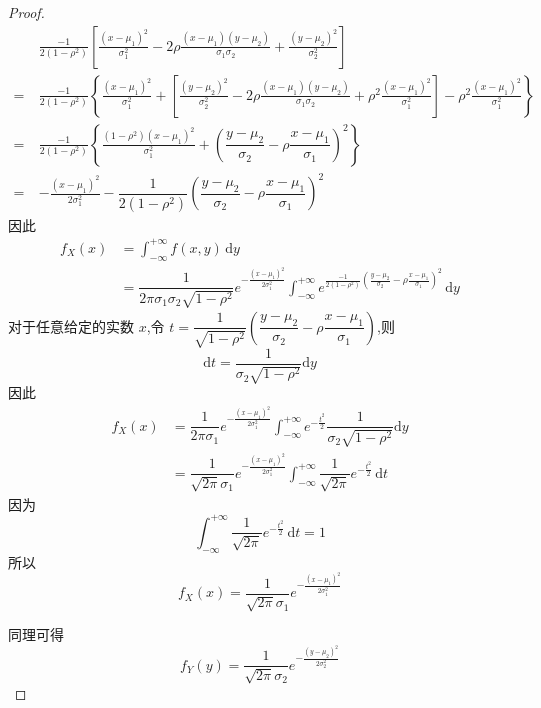 \begin{proof}
    $$
    \begin{aligned}
        & \frac{-1}{2(1-\rho^2)} \left[ \frac{(x-\mu_1)^2}{\sigma_1^2} - 2 \rho \frac{(x-\mu_1)(y-\mu_2)}{\sigma_1 \sigma_2} + \frac{(y-\mu_2)^2}{\sigma_2^2} \right] \\
        = \  & \frac{-1}{2(1-\rho^2)} \left\{ \frac{(x-\mu_1)^2}{\sigma_1^2} + \left[ \frac{(y-\mu_2)^2}{\sigma_2^2} - 2 \rho \frac{(x-\mu_1)(y-\mu_2)}{\sigma_1 \sigma_2} + \rho^2 \frac{(x-\mu_1)^2}{\sigma_1^2} \right] - \rho^2 \frac{(x-\mu_1)^2}{\sigma_1^2} \right\} \\
        = \  & \frac{-1}{2(1-\rho^2)} \left\{ \frac{(1-\rho^2)(x-\mu_1)^2}{\sigma_1^2} + \left( \dfrac{y-\mu_2}{\sigma_2} - \rho \dfrac{x-\mu_1}{\sigma_1} \right)^2 \right\} \\
        = \  & -\frac{(x-\mu_1)^2}{2\sigma_1^2} - \dfrac{1}{2(1-\rho^2)} \left( \dfrac{y-\mu_2}{\sigma_2} - \rho \dfrac{x-\mu_1}{\sigma_1} \right)^2
    \end{aligned}
    $$
    因此
    $$
    \begin{aligned}
        f_{X}(x) &= \int_{-\infty}^{+\infty} f(x,y) \, \text{d}y \\
        &= \dfrac{1}{2 \pi \sigma_1 \sigma_2 \sqrt{1-\rho^2}} e^{-\frac{(x-\mu_1)^2}{2 \sigma_1^2}} \int_{-\infty}^{+\infty} e^{\frac{-1}{2(1-\rho^2)} \left( \frac{y-\mu_2}{\sigma_2} - \rho \frac{x-\mu_1}{\sigma_1} \right)^2} \, \text{d}y
    \end{aligned}
    $$
    对于任意给定的实数 $x$,令 $t = \dfrac{1}{\sqrt{1-\rho^2}} \left( \dfrac{y-\mu_2}{\sigma_2} - \rho \dfrac{x-\mu_1}{\sigma_1} \right)$,则
    $$
    \text{d}t = \dfrac{1}{\sigma_2 \sqrt{1-\rho^2}} \text{d}y
    $$
    因此
    $$
    \begin{aligned}
        f_{X}(x) &= \dfrac{1}{2 \pi \sigma_1} e^{-\frac{(x-\mu_1)^2}{2 \sigma_1^2}} \int_{-\infty}^{+\infty} e^{-\frac{t^2}{2}} \dfrac{1}{\sigma_2 \sqrt{1-\rho^2}} \text{d}y \\
        &= \dfrac{1}{\sqrt{2\pi} \sigma_1} e^{-\frac{(x-\mu_1)^2}{2 \sigma_1^2}} \int_{-\infty}^{+\infty} \dfrac{1}{\sqrt{2\pi}} e^{-\frac{t^2}{2}} \, \text{d}t
    \end{aligned}
    $$
    因为
    $$
    \int_{-\infty}^{+\infty} \dfrac{1}{\sqrt{2\pi}} e^{-\frac{t^2}{2}} \, \text{d}t = 1
    $$
    所以
    $$
    f_{X}(x) = \dfrac{1}{\sqrt{2\pi} \sigma_1} e^{-\frac{(x-\mu_1)^2}{2 \sigma_1^2}}
    $$

    同理可得
    $$
    f_{Y}(y) = \dfrac{1}{\sqrt{2\pi} \sigma_2} e^{-\frac{(y-\mu_2)^2}{2 \sigma_2^2}}
    $$
\end{proof}

